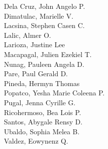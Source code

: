 Dela Cruz, John Angelo P. \\
Dimatulac, Marielle V. \\
Lacsina, Stephen Casen C. \\
Lalic, Almer O. \\
Larioza, Justine Lee \\
Macapagal, Julien Ezekiel T. \\
Nunag, Pauleen Angela D. \\
Pare, Paul Gerald D. \\
Pineda, Hermyn Thomas \\
Popatco, Yesha Marie Coleena P. \\
Pugal, Jenna Cyrille G. \\
Ricohermoso, Bea Lois P. \\
Santos, Abygale Rensy D. \\
Ubaldo, Sophia Melea B. \\
Valdez, Eowynenz Q. \\
